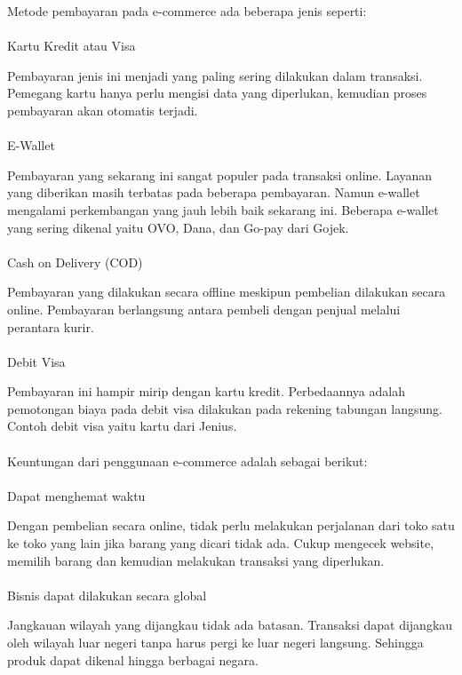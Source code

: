 \par Metode pembayaran pada e-commerce ada beberapa jenis seperti:	\\\\
Kartu Kredit atau Visa\\
\par Pembayaran jenis ini menjadi yang paling sering dilakukan dalam transaksi. Pemegang kartu hanya perlu mengisi data yang diperlukan, kemudian proses pembayaran akan otomatis terjadi. \\\\
E-Wallet\\
\par Pembayaran yang sekarang ini sangat populer pada transaksi online. Layanan yang diberikan masih terbatas pada beberapa pembayaran. Namun e-wallet mengalami perkembangan yang jauh lebih baik sekarang ini. Beberapa e-wallet yang sering dikenal yaitu OVO, Dana, dan Go-pay dari Gojek. \\\\
Cash on Delivery (COD)\\
\par Pembayaran yang dilakukan secara offline meskipun pembelian dilakukan secara online. Pembayaran berlangsung antara pembeli dengan penjual melalui perantara kurir. \\\\
Debit Visa\\
\par Pembayaran ini hampir mirip dengan kartu kredit. Perbedaannya adalah pemotongan biaya pada debit visa dilakukan pada rekening tabungan langsung. Contoh debit visa yaitu kartu dari Jenius.\\\\
Keuntungan dari penggunaan e-commerce adalah sebagai berikut:\\\\
Dapat menghemat waktu \\
\par Dengan pembelian secara online, tidak perlu melakukan perjalanan dari toko satu ke toko yang lain jika barang yang dicari tidak ada. Cukup mengecek website, memilih barang dan kemudian melakukan transaksi yang diperlukan. \\\\
Bisnis dapat dilakukan secara global \\
\par Jangkauan wilayah yang dijangkau tidak ada batasan. Transaksi dapat dijangkau oleh wilayah luar negeri tanpa harus pergi ke luar negeri langsung. Sehingga produk dapat dikenal hingga berbagai negara.\\\\
